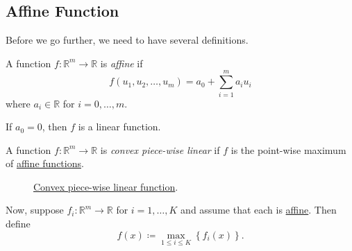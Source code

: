 \subsection{Affine Function}
Before we go further, we need to have several definitions.
\begin{definition}\label{def:affine-function}
	A function \(f\colon \mathbb{R}^{m}\to \mathbb{R}\) is \emph{affine} if
	\[
		f(u_1, u_2, \dots , u_m) = a_0 + \sum\limits_{i=1}^{m} a_{i}u_{i}
	\]
	where \(a_i \in\mathbb{R}\) for \(i = 0, \dots , m\).
\end{definition}

\begin{remark}
	If \(a_0 = 0\), then \(f\) is a linear function.
\end{remark}

\begin{definition}\label{def:convex-piece-wise-linear-function}
	A function \(f\colon \mathbb{R}^{m}\to \mathbb{R}\) is \emph{convex piece-wise linear} if \(f\) is the point-wise maximum of \hyperref[def:affine-function]{affine functions}.
\end{definition}

\begin{figure}[H]
	\centering
	\caption{\hyperref[def:convex-piece-wise-linear-function]{Convex piece-wise linear function}.}
	\label{fig:convex-piecewise-linear-function}
\end{figure}
Now, suppose \(f_{i}\colon \mathbb{R}^m \to \mathbb{R}\) for \(i = 1, \dots , K\) and assume that each is \hyperref[def:affine-function]{affine}.
Then define
\[
	f(x)\coloneqq \max_{1\leq i\leq K} \left\{ f_i(x) \right\}.
\]

